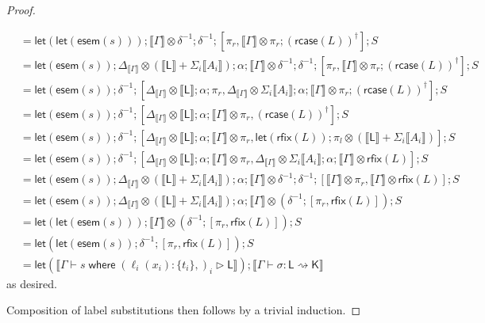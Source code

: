 \documentclass[acmsmall,screen,review]{acmart}
\newcommand{\ms}[1]{\ensuremath{\mathsf{#1}}}
\newcommand{\lto}{:}
\newcommand{\where}[2]{#1\;\ms{where}\;#2}
\newcommand{\wbranch}[3]{#1(#2) \lto \{#3\}}
\newcommand{\haslb}[3]{#1 \vdash #2 \rhd #3}
\newcommand{\lbsubst}[4]{#1 \vdash #2: #3 \rightsquigarrow #4}
\newcommand{\dnt}[1]{\llbracket{#1}\rrbracket}
\newcommand{\dmor}[1]{{\Delta}_{#1}}
\newcommand{\entrymor}[1]{\ms{esem}(#1)}
\newcommand{\lmor}[1]{\ms{let}(#1)}
\newcommand{\rcase}[1]{\ms{rcase}(#1)}
\newcommand{\rfix}[1]{\ms{rfix}(#1)}
\begin{document}
\begin{proof}
\begin{itemize}[leftmargin=*]
\begin{equation}
\begin{aligned}
          & = \lmor{\lmor{\entrymor{s}}} 
            ; \dnt{\Gamma} \otimes \delta^{-1} ; \delta^{-1}
            ; [\pi_r, \dnt{\Gamma} \otimes \pi_r ; (\rcase{L})^\dagger]
            ; S \\
        & = \lmor{\entrymor{s}} 
          ; \dmor{\dnt{\Gamma}} \otimes (\dnt{\ms{L}} + \Sigma_i\dnt{A_i}) ; \alpha 
          ; \dnt{\Gamma} \otimes \delta^{-1} ; \delta^{-1}
          ; [\pi_r, \dnt{\Gamma} \otimes \pi_r ; (\rcase{L})^\dagger] ; S 
          \\
        & = \lmor{\entrymor{s}} ; \delta^{-1} ; [
              \Delta_{\dnt{\Gamma}} \otimes \dnt{\ms{L}} ; \alpha ; \pi_r, 
              \Delta_{\dnt{\Gamma}} \otimes \Sigma_i\dnt{A_i}  
                ; \alpha ; \dnt{\Gamma} \otimes \pi_r ; (\rcase{L})^\dagger
            ]
          ; S \\
        & = \lmor{\entrymor{s}} ; \delta^{-1} ; [
              \Delta_{\dnt{\Gamma}} \otimes \dnt{\ms{L}} ; \alpha ; \dnt{\Gamma} \otimes \pi_r, 
              (\rcase{L})^\dagger
            ]
          ; S \\
        & = \lmor{\entrymor{s}} ; \delta^{-1} ; [
              \Delta_{\dnt{\Gamma}} \otimes \dnt{\ms{L}} ; \alpha ; \dnt{\Gamma} \otimes \pi_r, 
              \lmor{\rfix{L}} ; \pi_l \otimes (\dnt{\ms{L}} + \Sigma_i\dnt{A_i})
            ]
          ; S \\
        & = \lmor{\entrymor{s}} ; \delta^{-1} ; [
              \Delta_{\dnt{\Gamma}} \otimes \dnt{\ms{L}} ; \alpha ; \dnt{\Gamma} \otimes \pi_r, 
              \Delta_{\dnt{\Gamma}} \otimes \Sigma_i\dnt{A_i} ; \alpha 
                ; \dnt{\Gamma} \otimes \rfix{L}
            ]
          ; S \\
        & = \lmor{\entrymor{s}} 
          ; \Delta_{\dnt{\Gamma}} \otimes (\dnt{\ms{L}} + \Sigma_i\dnt{A_i}) ; \alpha
          ; \dnt{\Gamma} \otimes \delta^{-1} ; \delta^{-1}
          ; [
              \dnt{\Gamma} \otimes \pi_r, 
              \dnt{\Gamma} \otimes \rfix{L}
            ]
          ; S \\
        & = \lmor{\entrymor{s}} 
          ; \Delta_{\dnt{\Gamma}} \otimes (\dnt{\ms{L}} + \Sigma_i\dnt{A_i}) ; \alpha
          ; \dnt{\Gamma} \otimes (\delta^{-1} ; [\pi_r, \rfix{L}])
          ; S \\
        & = \lmor{\lmor{\entrymor{s}}}
          ; \dnt{\Gamma} \otimes (\delta^{-1} ; [\pi_r, \rfix{L}])
          ; S \\
        & = \lmor{\lmor{\entrymor{s}} ; \delta^{-1} ; [\pi_r, \rfix{L}] }
          ; S \\
        & = \lmor{\dnt{\haslb{\Gamma}{\where{s}{(\wbranch{\ell_i}{x_i}{t_i},)_i}}{\ms{L}}}}
          ; \dnt{\lbsubst{\Gamma}{\sigma}{\ms{L}}{\ms{K}}}
      \end{aligned}
    \end{equation}
    as desired.
  \end{itemize}
  Composition of label substitutions then follows by a trivial induction.
\end{proof}
\end{document}
